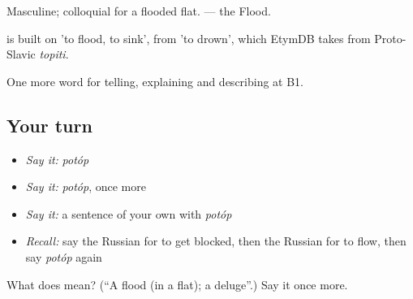 Masculine; colloquial for a flooded flat. \emph{ } — the Flood.

\begin{cousinweb}
\emph{} is built on \emph{} 'to flood, to sink', from \emph{} 'to drown', which EtymDB takes from Proto-Slavic \emph{topiti}.
\end{cousinweb}

\begin{grammarlens}[title={What you've built}]
One more word for telling, explaining and describing at B1.
\end{grammarlens}

\subsection*{Your turn}
\begin{itemize}
\raggedright
  \item \emph{Say it:} \emph{potóp}
  \item \emph{Say it:} \emph{potóp}, once more
  \item \emph{Say it:} a sentence of your own with \emph{potóp}
  \item \emph{Recall:} say the Russian for to get blocked, then the Russian for to flow, then say \emph{potóp} again
\end{itemize}

\begin{tcolorbox}[breakable,colback=teal!4,colframe=teal!35!black,title={Before you move on}]
What does  mean? (\textquotedblleft{}A flood (in a flat); a deluge\textquotedblright{}.) Say it once more.
\end{tcolorbox}
